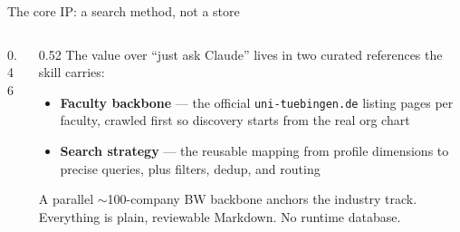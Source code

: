 \documentclass[11pt,aspectratio=169]{beamer}
\begin{document}
\begin{frame}{The core IP: a search method, not a store}
  \begin{columns}[T]
    \begin{column}{0.46\textwidth}
      \begin{center}
      \end{center}
    \end{column}
    \begin{column}{0.52\textwidth}
      \small
      The value over ``just ask Claude'' lives in two curated references the
      skill carries:
      \begin{itemize}
        \item \textbf{Faculty backbone} --- the official
          \texttt{uni-tuebingen.de} listing pages per faculty, crawled first
          so discovery starts from the real org chart
        \item \textbf{Search strategy} --- the reusable mapping from profile
          dimensions to precise queries, plus filters, dedup, and routing
      \end{itemize}
      A parallel $\sim$100-company BW backbone anchors the industry track.
      Everything is plain, reviewable Markdown. \alert{No runtime database.}
    \end{column}
  \end{columns}
\end{frame}
\end{document}
